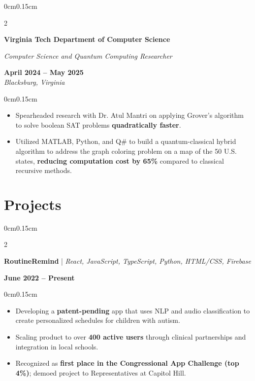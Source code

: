 \documentclass[10pt, letterpaper]{article}
\newenvironment{highlights}{
    \begin{itemize}[topsep=0pt, parsep=0pt, partopsep=0pt, itemsep=0pt, leftmargin=0.6cm]
}{
    \end{itemize}
}
\newenvironment{onecolentry}{
    \begin{adjustwidth}{0cm}{0.15cm}
}{
    \end{adjustwidth}
}
\newenvironment{twocolentry}[2][]{
    \onecolentry
    \def\secondColumn{#2}
    \setcolumnwidth{\fill, 4cm}
    \begin{paracol}{2}
}{
    \switchcolumn \raggedleft \secondColumn
    \end{paracol}
    \endonecolentry
}
\begin{document}
    \vspace{0.05cm}

    \begin{twocolentry}{\textbf{April 2024 -- May 2025} \\ \textit{Blacksburg, Virginia}}
        \textbf{Virginia Tech Department of Computer Science}
        
        \textit{Computer Science and Quantum Computing Researcher}
    \end{twocolentry}
    \vspace{-0.05cm}
    \begin{onecolentry}
        \begin{highlights}
            \item Spearheaded research with Dr. Atul Mantri on applying Grover's algorithm to solve boolean SAT problems \textbf{quadratically faster}.
            \item Utilized MATLAB, Python, and Q\# to build a quantum-classical hybrid algorithm to address the graph coloring problem on a map of the 50 U.S. states, \textbf{reducing computation cost by 65\%} compared to classical recursive methods.
        \end{highlights}
    \end{onecolentry}

    \vspace{0.05cm}

    \section{Projects}
    \vspace{0.1cm}

    \begin{twocolentry}{\textbf{June 2022 -- Present}}
        \textbf{RoutineRemind} | \textit{React, JavaScript, TypeScript, Python, HTML/CSS, Firebase}
    \end{twocolentry}
    \vspace{-0.05cm}
    \begin{onecolentry}
        \begin{highlights}
            \item Developing a \textbf{patent-pending} app that uses NLP and audio classification to create personalized schedules for children with autism.
            \item Scaling product to over \textbf{400 active users} through clinical partnerships and integration in local schools.
            \item Recognized as \textbf{first place in the Congressional App Challenge (top 4\%)}; demoed project to Representatives at Capitol Hill.
        \end{highlights}
    \end{onecolentry}
\end{document}
